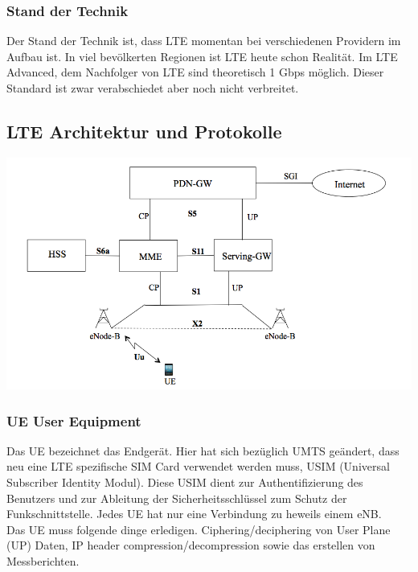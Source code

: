 \subsubsection{Stand der Technik}
Der Stand der Technik ist, dass LTE momentan bei verschiedenen Providern im Aufbau ist. In viel bevölkerten Regionen ist LTE heute schon Realität. Im LTE Advanced, dem Nachfolger von LTE sind theoretisch 1 Gbps möglich. Dieser Standard ist zwar verabschiedet aber noch nicht verbreitet.

\subsection{LTE Architektur und Protokolle}
\includegraphics[width = 0.5 \linewidth]{./Pics/LTE1.png}
\subsubsection{UE User Equipment }
Das UE bezeichnet das Endgerät. Hier hat sich bezüglich UMTS geändert, dass neu eine LTE spezifische SIM Card verwendet werden muss, USIM (Universal Subscriber Identity Modul). Diese USIM dient zur Authentifizierung des Benutzers und zur Ableitung der Sicherheitsschlüssel zum Schutz der Funkschnittstelle. Jedes UE hat nur eine Verbindung zu heweils einem eNB. \\
Das UE muss folgende dinge erledigen. Ciphering/deciphering von User Plane (UP) Daten, IP header compression/decompression sowie das erstellen von Messberichten. 

